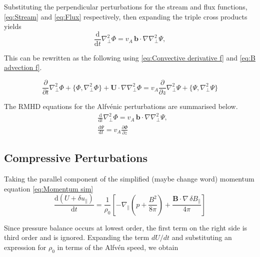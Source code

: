 Substituting the perpendicular perturbations for the stream and flux functions, \eqref{eq:Stream} and \eqref{eq:Flux} respectively, then expanding the triple cross products yields
\begin{equation*}
    \frac{\mathrm{d}}{\mathrm{d}t}\nabla_{\perp}^{2}\Phi = v_{A}\,\boldsymbol{b}\cdot\nabla\nabla_{\perp}^{2}\Psi,
\end{equation*}

This can be rewritten as the following using \eqref{eq:Convective derivative f} and \eqref{eq:B advection f}.

\begin{equation}
    \label{eq:Vorticity RMHD}
    \frac{\partial}{\partial t} \nabla_{\perp}^{2} \Phi + \{\Phi, \nabla_{\perp}^{2} \Phi\} + \boldsymbol{U}\cdot\nabla \nabla_{\perp}^{2} \Phi 
    = v_{A} \frac{\partial}{\partial z} \nabla_{\perp}^{2} \Psi + \{\Psi, \nabla_{\perp}^{2} \Psi\}
\end{equation}

The RMHD equations for the Alfv\'enic perturbations are summarised below.
\begin{equation}
    \begin{split}
    &\frac{\mathrm{d}}{\mathrm{d}t}\nabla_{\perp}^{2}\Phi = v_{A}\,\boldsymbol{b}\cdot\nabla\nabla_{\perp}^{2}\Psi,\\
   & \frac{\mathrm{d}\Psi}{\mathrm{d}t} = v_{A}\frac{\partial\Phi}{\partial z}
    \end{split}
    \label{eq:RMHD perp}
\end{equation}

\subsection{Compressive Perturbations}
Taking the parallel component of the simplified (maybe change word) momentum equation \eqref{eq:Momentum sim}
\begin{equation}
    \frac{\mathrm{d} (U+\delta u_{\parallel})}{\mathrm{d} t} = \frac{1}{\rho_0} \left[-\nabla_{\parallel}\left( p + \frac{B^2}{8\pi} \right) + \frac{\boldsymbol{B} \cdot \nabla \, \delta B_{\parallel}}{4\pi} \right]
    \label{eq:Momentum E U slow}
\end{equation}

Since pressure balance occurs at lowest order, the first term on the right side is third order and is ignored. Expanding the term \(dU/dt\) and substituting an expression for \(\rho_0\) in terms of the Alfv\'en speed, we obtain

